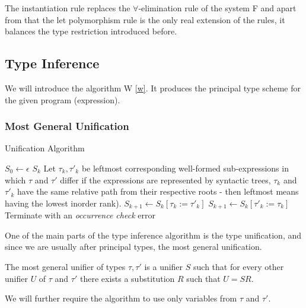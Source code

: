 The instantiation rule replaces the $\forall$-elimination rule of the system F and apart from that the let polymorphism rule is the only real extension of the rules, it balances the type restriction introduced before.

\subsection{Type Inference}

We will introduce the algorithm W \ref{w}. It produces the principal type scheme for the given program (expression).

\subsubsection{Most General Unification}

\begin{algorithm}[t]
\caption{Unification Algorithm \cite{robinson1965machine}}
\label{mgu}
\begin{algorithmic}[1]
    \State $S_0 \gets \epsilon$
        \Return $S_k$
    \EndIf
    \State Let $\tau_k, \tau'_k$ be leftmost corresponding well-formed sub-expressions in which $\tau$ and $\tau'$ differ \Comment if the expressions are represented by syntactic trees, $\tau_k$ and $\tau'_k$ have the same relative path from their respective roots - then leftmost means having the lowest inorder rank).
        \State $S_{k+1} \gets S_k [\tau_k := \tau'_k]$
        \State $S_{k+1} \gets S_k [\tau'_k := \tau_k]$
    \Else
        \State Terminate with an \textit{occurrence check} error
    \EndIf
    \EndFor
\EndFunction
\end{algorithmic}
\end{algorithm}

One of the main parts of the type inference algorithm is the type unification, and since we are usually after principal types, the most general unification.

The most general unifier of types $\tau, \tau'$ is a unifier $S$ such that for every other unifier $U$ of $\tau$ and $\tau'$ there exists a substitution $R$ such that $U = S R$. \cite{damas1982principal} %

We will further require the algorithm to use only variables from $\tau$ and $\tau'$.

